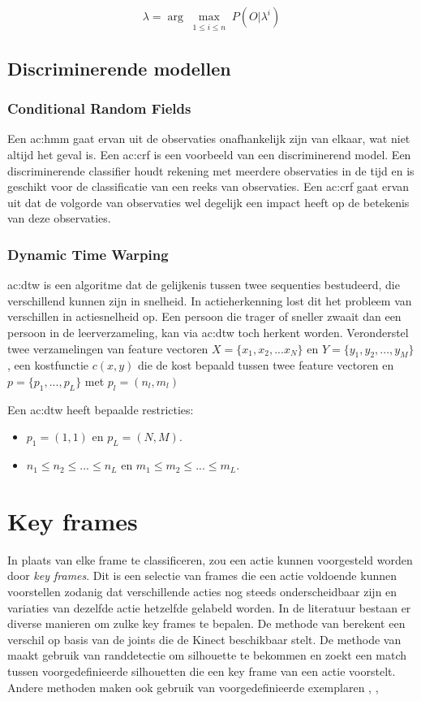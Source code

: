 $$\lambda = \arg\max_{\substack{1 \leq i \leq n}} P(O|\lambda^i) $$


\subsection{Discriminerende modellen}
\subsubsection{Conditional Random Fields}
Een \gls{ac:hmm} gaat ervan uit de observaties onafhankelijk zijn van elkaar, wat niet altijd het geval is. Een \gls{ac:crf} is een voorbeeld van een discriminerend model. Een discriminerende classifier houdt rekening met meerdere observaties in de tijd en is geschikt voor de classificatie van een reeks van observaties. Een \gls{ac:crf} gaat ervan uit dat de volgorde van observaties wel degelijk een impact heeft op de betekenis van deze observaties.

\subsubsection{Dynamic Time Warping}
\gls{ac:dtw} is een algoritme dat de gelijkenis tussen twee sequenties bestudeerd, die verschillend kunnen zijn in snelheid. In actieherkenning lost dit het probleem van verschillen in actiesnelheid op. Een persoon die trager of sneller zwaait dan een persoon in de leerverzameling, kan via \gls{ac:dtw} toch herkent worden. Veronderstel twee verzamelingen van feature vectoren $X = \{x_1, x_2, ... x_N\}$ en $Y = \{y_1, y_2, ..., y_M\}$, een kostfunctie $c(x, y)$ die de kost bepaald tussen twee feature vectoren en $p = \{p_1, ..., p_L\}$ met $p_l = (n_l, m_l)$  

Een \gls{ac:dtw} heeft bepaalde restricties:
\begin{itemize}
	\item $p_1 = (1, 1)$ en $p_L = (N, M)$.
	\item $n_1 \leq n_2 \leq ... \leq n_L$ en $m_1 \leq m_2 \leq ... \leq m_L$.
\end{itemize}


\section{Key frames}
In plaats van elke frame te classificeren, zou een actie kunnen voorgesteld worden door \textit{key frames}. Dit is een selectie van frames die een actie voldoende kunnen voorstellen zodanig dat verschillende acties nog steeds onderscheidbaar zijn en variaties van dezelfde actie hetzelfde gelabeld worden. In de literatuur bestaan er diverse manieren om zulke key frames te bepalen. De methode van \cite{Suolan2017} berekent een verschil op basis van de joints die de Kinect beschikbaar stelt. De methode van \cite{Carlsson2001} maakt gebruik van randdetectie om silhouette te bekommen en zoekt een match tussen voorgedefinieerde silhouetten die een key frame van een actie voorstelt. Andere methoden maken ook gebruik van voorgedefinieerde exemplaren \cite{Weinland2008a}, \cite{Fathi2007},



